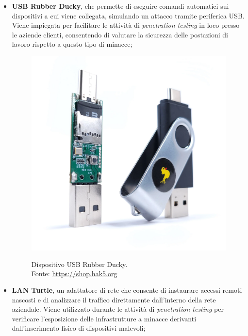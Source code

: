 \begin{itemize}
    \item \textbf{USB Rubber Ducky}, che permette di eseguire comandi automatici sui dispositivi a cui viene collegata, simulando un attacco tramite periferica USB. Viene impiegata per facilitare le attività di \textit{penetration testing} in loco presso le aziende clienti, consentendo di valutare la sicurezza delle postazioni di lavoro rispetto a questo tipo di minacce;\\
    \begin{figure}[H]
    \centering
    \includegraphics[alt={USB Rubber Ducky}, width=0.8\columnwidth]{img/usb-rubber-ducky_mk2_2000x.jpg}
    \caption{Dispositivo USB Rubber Ducky.\\ Fonte: \url{https://shop.hak5.org}}
    \label{fig:usb-rubber-ducky}
    \end{figure}
    \item \textbf{LAN Turtle}, un adattatore di rete che consente di instaurare accessi remoti nascosti e di analizzare il traffico direttamente dall'interno della rete aziendale. Viene utilizzato durante le attività di \textit{penetration testing} per verificare l'esposizione delle infrastrutture a minacce derivanti dall'inserimento fisico di dispositivi malevoli;
    \begin{figure}[H]
    \centering

\end{figure}
\end{itemize}
